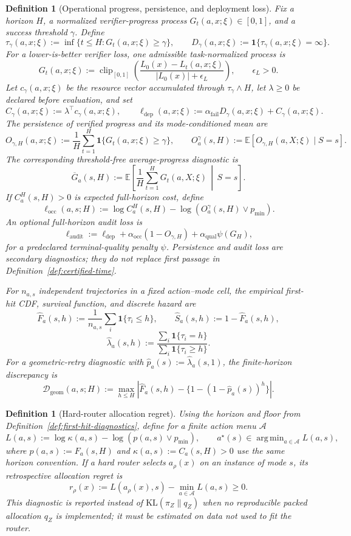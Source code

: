 \documentclass[10pt]{article}
\DeclareMathOperator*{\argmin}{arg\,min}
\theoremstyle{paperplain}
\theoremstyle{paperdefinition}
\newtheorem{definition}[theorem]{Definition}
\theoremstyle{paperremark}
\newcommand{\KL}{\mathrm{KL}}
\newcommand{\E}{\mathbb{E}}
\newcommand{\cA}{\mathcal{A}}
\begin{document}
\begin{definition}[Operational progress, persistence, and deployment loss]
\label{def:operational-progress-loss}
Fix a horizon \(H\), a normalized verifier-progress process
\(G_t(a,x;\xi)\in[0,1]\), and a success threshold \(\gamma\).  Define
\[
\tau_\gamma(a,x;\xi)
:=\inf\{t\le H:G_t(a,x;\xi)\ge\gamma\},
\qquad
D_\gamma(a,x;\xi):=\mathbf{1}\{\tau_\gamma(a,x;\xi)=\infty\}.
\]
For a lower-is-better verifier loss, one admissible task-normalized process is
\[
G_t(a,x;\xi)
:=\operatorname{clip}_{[0,1]}\!\left(
\frac{L_0(x)-L_t(a,x;\xi)}{|L_0(x)|+\epsilon_L}
\right),
\qquad \epsilon_L>0.
\]
Let \(c_\gamma(a,x;\xi)\) be the resource vector accumulated through
\(\tau_\gamma\wedge H\), let \(\lambda\ge0\) be declared before evaluation,
and set
\[
C_\gamma(a,x;\xi):=\lambda^\top c_\gamma(a,x;\xi),
\qquad
\ell_{\mathrm{dep}}(a,x;\xi)
:=\alpha_{\mathrm{fail}}D_\gamma(a,x;\xi)+C_\gamma(a,x;\xi).
\]
The persistence of verified progress and its mode-conditioned mean are
\[
O_{\gamma,H}(a,x;\xi)
:=\frac1H\sum_{t=1}^H\mathbf{1}\{G_t(a,x;\xi)\ge\gamma\},
\qquad
O_a^\gamma(s,H):=\E[O_{\gamma,H}(a,X;\xi)\mid S=s].
\]
The corresponding threshold-free average-progress diagnostic is
\[
\overline G_a(s,H)
:=\E\!\left[\frac1H\sum_{t=1}^H G_t(a,X;\xi)\,\middle|\,S=s\right].
\]
If \(C_a^H(s,H)>0\) is expected full-horizon cost, define
\[
\ell_{\mathrm{occ}}(a,s;H)
:=\log C_a^H(s,H)-\log(O_a^\gamma(s,H)\vee p_{\min}).
\]
An optional full-horizon audit loss is
\[
\ell_{\mathrm{audit}}
:=\ell_{\mathrm{dep}}
+\alpha_{\mathrm{occ}}(1-O_{\gamma,H})
+\alpha_{\mathrm{qual}}\psi(G_H),
\]
for a predeclared terminal-quality penalty \(\psi\).  Persistence and audit
loss are secondary diagnostics; they do not replace first passage in
Definition~\ref{def:certified-time}.

For \(n_{a,s}\) independent trajectories in a fixed action--mode cell, the
empirical first-hit CDF, survival function, and discrete hazard are
\[
\widehat F_a(s,h)
:=\frac1{n_{a,s}}\sum_i\mathbf{1}\{\tau_i\le h\},
\qquad
\widehat S_a(s,h):=1-\widehat F_a(s,h),
\]
\[
\widehat\lambda_a(s,h)
:=\frac{\sum_i\mathbf{1}\{\tau_i=h\}}
{\sum_i\mathbf{1}\{\tau_i\ge h\}}.
\]
For a geometric-retry diagnostic with
\(\widehat p_a(s):=\widehat\lambda_a(s,1)\), the finite-horizon discrepancy is
\[
\mathcal D_{\mathrm{geom}}(a,s;H)
:=\max_{h\le H}
\left|\widehat F_a(s,h)-\{1-(1-\widehat p_a(s))^h\}\right|.
\]
\end{definition}

\begin{definition}[Hard-router allocation regret]
\label{def:allocation-regret}
Using the horizon and floor from Definition~\ref{def:first-hit-diagnostics}, define for a finite action menu $\cA$
\[
L(a,s):=\log\kappa(a,s)-\log(p(a,s)\vee p_{\min}),
\qquad
a^\star(s)\in\argmin_{a\in\cA}L(a,s),
\]
where $p(a,s):=F_a(s,H)$ and $\kappa(a,s):=C_a(s,H)>0$ use the same horizon convention.
If a hard router selects $a_\rho(x)$ on an instance of mode $s$, its retrospective allocation regret is
\[
r_\rho(x):=L(a_\rho(x),s)-\min_{a\in\cA}L(a,s)\ge0.
\]
This diagnostic is reported instead of $\KL(\pi_Z\|q_Z)$ when no reproducible packed allocation $q_Z$ is implemented; it must be estimated on data not used to fit the router.
\end{definition}
\end{document}
